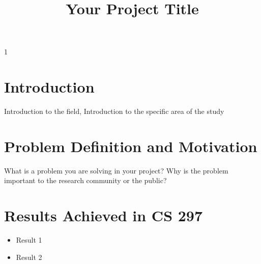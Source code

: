 \documentclass[11pt,onecolumn]{sjsucs-proposal}
\def\exampleflag{1}
\begin{document}
\if\exampleflag1
  
\else

\title{Your Project Title}

\def\myname{Your Name}

\def\adv{Your Advisor}
\def\advemail{Your Advisor's Email}

\def\comone{Your Committee Member}
\def\comoneemail{Your Committee Member's Email}

\def\comtwo{Your Committee Member}
\def\comtwoemail{Your Committee Member's Email}
\def\comtwoaffil{}

\def\semester{Semester}
\def\year{Year}


\def\keywords{Project keyword 1, Project keyword 2, ...}


\maketitle %


\section{Introduction}
Introduction to the field, 
Introduction to the specific area of the study

\makekeywords %

\section{Problem Definition and Motivation}
What is a problem you are solving in your project? Why is the problem important to the research community or the public?

\section{Results Achieved in CS 297}
\begin{itemize}
  \item Result 1
  \item Result 2
\end{itemize}
\end{document}
